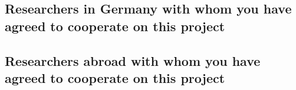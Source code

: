 \documentclass{scrartcl}
\begin{document}
\subsection{Researchers in Germany with whom you have agreed to cooperate on this project}
\label{sec:collab:germany}

%
%
%

\subsection{Researchers abroad with whom you have agreed to cooperate on this project}
\label{sec:collab:abroad}
\end{document}
